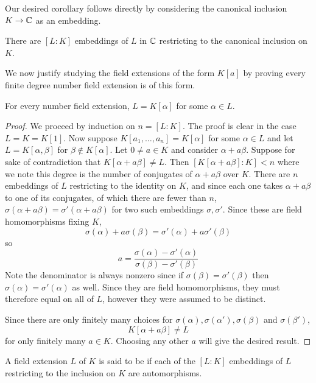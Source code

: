 Our desired corollary follows directly by considering the canonical inclusion $K\rightarrow \mathbb{C}$ as an embedding.
\begin{corollary}
There are $[L:K]$ embeddings of $L$ in $\mathbb{C}$ restricting to the canonical inclusion on $K$.
\end{corollary}

We now justify studying the field extensions of the form $K[a]$ by proving every finite degree number field extension is of this form.

\begin{theorem}\label{classifying-finite-field-extensions}
For every number field extension, $L=K[\alpha]$ for some $\alpha \in L$.
\end{theorem}
\begin{proof}
We proceed by induction on $n=[L:K]$. The proof is clear in the case $L=K=K[1]$. Now suppose $K[a_1,\dots,a_{n}]=K[\alpha]$ for some $\alpha \in L$ and let $L=K[\alpha,\beta]$ for $\beta\not\in K[\alpha]$. Let $0\neq a\in K$ and consider $\alpha+a\beta$. Suppose for sake of contradiction that $K[\alpha+a\beta]\neq L$. Then $[K[\alpha+a\beta]:K]<n$ where we note this degree is the number of conjugates of $\alpha+a\beta$ over $K$. There are $n$ embeddings of $L$ restricting to the identity on $K$, and since each one takes $\alpha+a\beta$ to one of its conjugates, of which there are fewer than $n$, $\sigma(\alpha+a\beta)=\sigma'(\alpha+a\beta)$ for two such embeddings $\sigma,\sigma'$. Since these are field homomorphisms fixing $K$, 
$$\sigma(\alpha)+a\sigma(\beta)=\sigma'(\alpha)+a\sigma'(\beta)$$
so
$$a=\frac{\sigma(\alpha)-\sigma'(\alpha)}{\sigma(\beta)-\sigma'(\beta)}$$
Note the denominator is always nonzero since if $\sigma(\beta)=\sigma'(\beta)$ then $\sigma(\alpha)=\sigma'(\alpha)$ as well. Since they are field homomorphisms, they must therefore equal on all of $L$, however they were assumed to be distinct.

Since there are only finitely many choices for $\sigma(\alpha),\sigma(\alpha'),\sigma(\beta)$ and $\sigma(\beta')$,
$$K[\alpha+a\beta]\neq L$$
for only finitely many $a\in K$. Choosing any other $a$ will give the desired result.

\end{proof}
\begin{definition}
A field extension $L$ of $K$ is said to be  if each of the $[L:K]$ embeddings of $L$ restricting to the inclusion on $K$ are automorphisms.
\end{definition}

